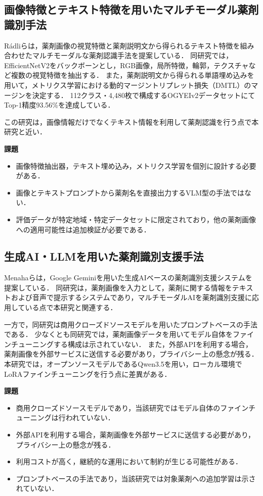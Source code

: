 \documentclass{jsarticle}
\begin{document}
\subsection{画像特徴とテキスト特徴を用いたマルチモーダル薬剤識別手法}

Rádliら\cite{radli2024metric}は，薬剤画像の視覚特徴と薬剤説明文から得られるテキスト特徴を組み合わせたマルチモーダルな薬剤認識手法を提案している．
同研究では，EfficientNetV2をバックボーンとし，RGB画像，局所特徴，輪郭，テクスチャなど複数の視覚特徴を抽出する．
また，薬剤説明文から得られる単語埋め込みを用いて，メトリクス学習における動的マージントリプレット損失（DMTL）のマージンを決定する．
112クラス・4,480枚で構成するOGYEIv2データセットにてTop-1精度93.56\%を達成している．

この研究は，画像情報だけでなくテキスト情報を利用して薬剤認識を行う点で本研究と近い．

\textbf{課題}
\begin{itemize}
  \item 画像特徴抽出器，テキスト埋め込み，メトリクス学習を個別に設計する必要がある．
  \item 画像とテキストプロンプトから薬剤名を直接出力するVLM型の手法ではない．
  \item 評価データが特定地域・特定データセットに限定されており，他の薬剤画像への適用可能性は追加検証が必要である．
\end{itemize}

\subsection{生成AI・LLMを用いた薬剤識別支援手法}

Menahaら\cite{gemini2024pill}は，Google Geminiを用いた生成AIベースの薬剤識別支援システムを提案している．
同研究は，薬剤画像を入力として，薬剤に関する情報をテキストおよび音声で提示するシステムであり，マルチモーダルAIを薬剤識別支援に応用している点で本研究と関連する．

一方で，同研究は商用クローズドソースモデルを用いたプロンプトベースの手法である．
少なくとも同研究では，薬剤画像データを用いてモデル自体をファインチューニングする構成は示されていない．
また，外部APIを利用する場合，薬剤画像を外部サービスに送信する必要があり，プライバシー上の懸念が残る．
本研究では，オープンソースモデルであるQwen3.5を用い，ローカル環境でLoRAファインチューニングを行う点に差異がある．

\textbf{課題}
\begin{itemize}
  \item 商用クローズドソースモデルであり，当該研究ではモデル自体のファインチューニングは行われていない．
  \item 外部APIを利用する場合，薬剤画像を外部サービスに送信する必要があり，プライバシー上の懸念が残る．
  \item 利用コストが高く，継続的な運用において制約が生じる可能性がある．
  \item プロンプトベースの手法であり，当該研究では対象薬剤への追加学習は示されていない．
\end{itemize}
\end{document}
